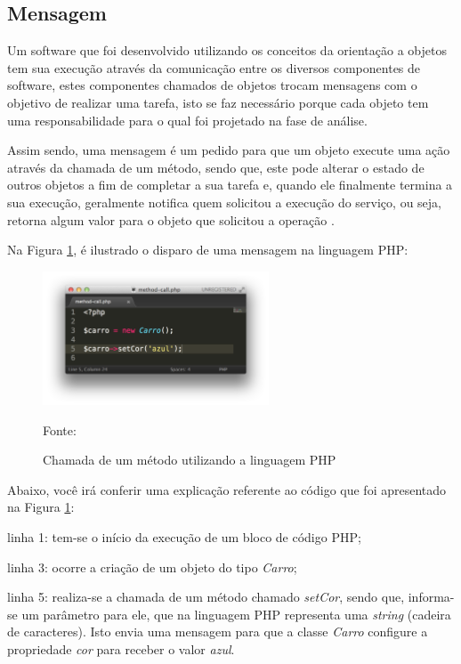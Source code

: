 \subsection{Mensagem}

Um software que foi desenvolvido utilizando os conceitos da orientação a
objetos tem sua execução através da comunicação entre os diversos componentes
de software, estes componentes chamados de objetos trocam mensagens com o
objetivo de realizar uma tarefa, isto se faz necessário porque cada objeto  tem
uma responsabilidade para o qual foi projetado na fase de análise.

Assim sendo, uma mensagem é um pedido para que um objeto execute uma ação
através da chamada de um método, sendo que, este pode alterar o estado de
outros objetos a fim de completar a sua tarefa e, quando ele finalmente termina
a sua execução, geralmente notifica quem solicitou a execução do serviço, ou
seja, retorna algum valor para o objeto que solicitou a operação
\cite{c++ComoProgramar}.

Na Figura \ref{fig:mensagem}, é ilustrado o disparo de uma mensagem na linguagem
\acs{PHP}:

\begin{figure}[h!tb]
	\caption{Chamada de um método utilizando a linguagem PHP}
	\label{fig:mensagem}

	\centering
	\includegraphics[width=0.6\textwidth]{images/method-call.png}

	\centering
	\footnotesize Fonte: \fonteOAutor
\end{figure}

\FloatBarrier 	%

Abaixo, você irá conferir uma explicação referente ao código que foi
apresentado na Figura \ref{fig:mensagem}:

\begin{alineas}
    \item linha 1: tem-se o início da execução de um bloco de código
    \acs{PHP};
    \item linha 3: ocorre a criação de um objeto do tipo \textit{Carro};
    \item linha 5: realiza-se a chamada de um método chamado
    \textit{setCor}, sendo que, informa-se um parâmetro para ele, que na
    linguagem \acs{PHP} representa uma \textit{string} (cadeira de caracteres).
    Isto envia uma mensagem para que a classe \textit{Carro} configure
    a propriedade \textit{cor} para receber o valor \textit{azul}.
\end{alineas}

